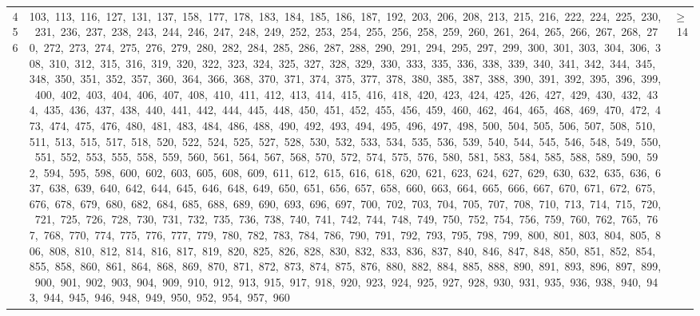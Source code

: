 \begin{longtable}{c|p{}|r}
456 & 103,\ 113,\ 116,\ 127,\ 131,\ 137,\ 158,\ 177,\ 178,\ 183,\ 184,\ 185,\ 186,\ 187,\ 192,\ 203,\ 206,\ 208,\ 213,\ 215,\ 216,\ 222,\ 224,\ 225,\ 230,\ 231,\ 236,\ 237,\ 238,\ 243,\ 244,\ 246,\ 247,\ 248,\ 249,\ 252,\ 253,\ 254,\ 255,\ 256,\ 258,\ 259,\ 260,\ 261,\ 264,\ 265,\ 266,\ 267,\ 268,\ 270,\ 272,\ 273,\ 274,\ 275,\ 276,\ 279,\ 280,\ 282,\ 284,\ 285,\ 286,\ 287,\ 288,\ 290,\ 291,\ 294,\ 295,\ 297,\ 299,\ 300,\ 301,\ 303,\ 304,\ 306,\ 308,\ 310,\ 312,\ 315,\ 316,\ 319,\ 320,\ 322,\ 323,\ 324,\ 325,\ 327,\ 328,\ 329,\ 330,\ 333,\ 335,\ 336,\ 338,\ 339,\ 340,\ 341,\ 342,\ 344,\ 345,\ 348,\ 350,\ 351,\ 352,\ 357,\ 360,\ 364,\ 366,\ 368,\ 370,\ 371,\ 374,\ 375,\ 377,\ 378,\ 380,\ 385,\ 387,\ 388,\ 390,\ 391,\ 392,\ 395,\ 396,\ 399,\ 400,\ 402,\ 403,\ 404,\ 406,\ 407,\ 408,\ 410,\ 411,\ 412,\ 413,\ 414,\ 415,\ 416,\ 418,\ 420,\ 423,\ 424,\ 425,\ 426,\ 427,\ 429,\ 430,\ 432,\ 434,\ 435,\ 436,\ 437,\ 438,\ 440,\ 441,\ 442,\ 444,\ 445,\ 448,\ 450,\ 451,\ 452,\ 455,\ 456,\ 459,\ 460,\ 462,\ 464,\ 465,\ 468,\ 469,\ 470,\ 472,\ 473,\ 474,\ 475,\ 476,\ 480,\ 481,\ 483,\ 484,\ 486,\ 488,\ 490,\ 492,\ 493,\ 494,\ 495,\ 496,\ 497,\ 498,\ 500,\ 504,\ 505,\ 506,\ 507,\ 508,\ 510,\ 511,\ 513,\ 515,\ 517,\ 518,\ 520,\ 522,\ 524,\ 525,\ 527,\ 528,\ 530,\ 532,\ 533,\ 534,\ 535,\ 536,\ 539,\ 540,\ 544,\ 545,\ 546,\ 548,\ 549,\ 550,\ 551,\ 552,\ 553,\ 555,\ 558,\ 559,\ 560,\ 561,\ 564,\ 567,\ 568,\ 570,\ 572,\ 574,\ 575,\ 576,\ 580,\ 581,\ 583,\ 584,\ 585,\ 588,\ 589,\ 590,\ 592,\ 594,\ 595,\ 598,\ 600,\ 602,\ 603,\ 605,\ 608,\ 609,\ 611,\ 612,\ 615,\ 616,\ 618,\ 620,\ 621,\ 623,\ 624,\ 627,\ 629,\ 630,\ 632,\ 635,\ 636,\ 637,\ 638,\ 639,\ 640,\ 642,\ 644,\ 645,\ 646,\ 648,\ 649,\ 650,\ 651,\ 656,\ 657,\ 658,\ 660,\ 663,\ 664,\ 665,\ 666,\ 667,\ 670,\ 671,\ 672,\ 675,\ 676,\ 678,\ 679,\ 680,\ 682,\ 684,\ 685,\ 688,\ 689,\ 690,\ 693,\ 696,\ 697,\ 700,\ 702,\ 703,\ 704,\ 705,\ 707,\ 708,\ 710,\ 713,\ 714,\ 715,\ 720,\ 721,\ 725,\ 726,\ 728,\ 730,\ 731,\ 732,\ 735,\ 736,\ 738,\ 740,\ 741,\ 742,\ 744,\ 748,\ 749,\ 750,\ 752,\ 754,\ 756,\ 759,\ 760,\ 762,\ 765,\ 767,\ 768,\ 770,\ 774,\ 775,\ 776,\ 777,\ 779,\ 780,\ 782,\ 783,\ 784,\ 786,\ 790,\ 791,\ 792,\ 793,\ 795,\ 798,\ 799,\ 800,\ 801,\ 803,\ 804,\ 805,\ 806,\ 808,\ 810,\ 812,\ 814,\ 816,\ 817,\ 819,\ 820,\ 825,\ 826,\ 828,\ 830,\ 832,\ 833,\ 836,\ 837,\ 840,\ 846,\ 847,\ 848,\ 850,\ 851,\ 852,\ 854,\ 855,\ 858,\ 860,\ 861,\ 864,\ 868,\ 869,\ 870,\ 871,\ 872,\ 873,\ 874,\ 875,\ 876,\ 880,\ 882,\ 884,\ 885,\ 888,\ 890,\ 891,\ 893,\ 896,\ 897,\ 899,\ 900,\ 901,\ 902,\ 903,\ 904,\ 909,\ 910,\ 912,\ 913,\ 915,\ 917,\ 918,\ 920,\ 923,\ 924,\ 925,\ 927,\ 928,\ 930,\ 931,\ 935,\ 936,\ 938,\ 940,\ 943,\ 944,\ 945,\ 946,\ 948,\ 949,\ 950,\ 952,\ 954,\ 957,\ 960 & $\ge$ 14 \\

\end{longtable}
